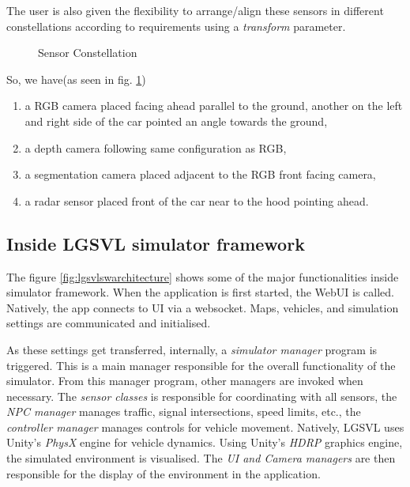 The user is also given the flexibility to arrange/align these sensors in different constellations according to
requirements using a \textit{transform} parameter.
\begin{figure}[!ht]
	\centering
    \def\svgwidth{\textwidth}
    \caption{Sensor Constellation}
    \label{fig:simplesensorconstellation}
\end{figure}

So, we have(as seen in fig. \ref{fig:simplesensorconstellation})

\begin{enumerate}

    \item a RGB camera placed facing ahead parallel to the ground, another on
the left and right side of the car pointed an angle towards the ground,
    \item a depth camera following same configuration as RGB,
    \item a segmentation camera placed adjacent to the RGB front facing camera,
    \item a radar sensor placed front of the car near to the hood pointing ahead.
\end{enumerate}

\subsection{Inside LGSVL simulator framework}
The figure \ref{fig:lgsvlswarchitecture} shows some of the major functionalities inside
simulator framework. When the application is first started, the WebUI is called. Natively,
the app connects to UI via a websocket. Maps, vehicles, and simulation settings are
communicated and initialised.

As these settings get transferred, internally, a \textit{simulator manager} program is
triggered. This is a main manager responsible for the overall functionality of the
simulator. From this manager program, other managers are invoked when necessary. The
\textit{sensor classes} is responsible for coordinating with all sensors, the \textit{NPC
manager} manages traffic, signal intersections, speed limits, etc., the \textit{controller
manager} manages controls for vehicle movement. Natively, LGSVL uses Unity's \textit{PhysX} engine
for vehicle dynamics. Using Unity's \textit{HDRP} graphics engine, the simulated environment is visualised. The
\textit{UI and Camera managers} are then responsible for the display of the environment in
the application.

